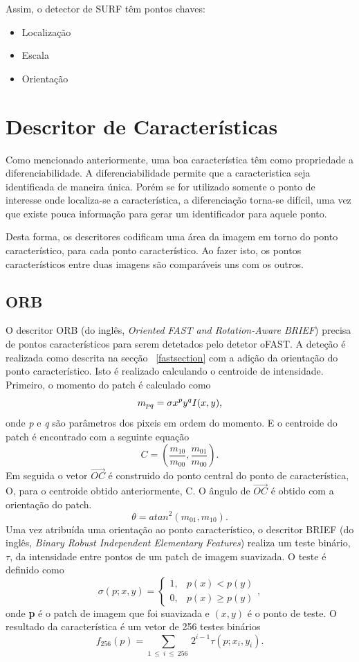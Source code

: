 Assim, o detector de SURF têm pontos chaves:
\begin{itemize}
	\item Localização
	\item Escala
	\item Orientação
\end{itemize}


\section{Descritor de Características}

Como mencionado anteriormente, uma boa característica têm como propriedade a diferenciabilidade. A diferenciabilidade permite que a caracteristica seja identificada de maneira única. Porém se for utilizado somente o ponto de interesse onde localiza-se a característica, a diferenciação torna-se difícil, uma vez que existe pouca informação para gerar um identificador para aquele ponto.

Desta forma, os descritores codificam uma área da imagem em torno do ponto característico, para cada ponto característico. Ao fazer isto, os pontos característicos entre duas imagens são comparáveis uns com os outros.


\subsection{ORB}

O descritor ORB (do inglês, \textit{Oriented FAST and Rotation-Aware BRIEF}) precisa de pontos característicos para serem detetados pelo detetor oFAST. A deteção é realizada como descrita na secção ~\ref{fastsection} com a adição da orientação do ponto característico. Isto é realizado calculando o centroide de intensidade. Primeiro, o momento do patch é calculado como \[ \textit{$m_{pq}$} = \sigma \textit{$ x^py^qI$}(x,y) ,\]
onde \textit{p} e \textit{q} são parâmetros dos pixeis em ordem do momento. E o centroide do patch é encontrado com a seguinte equação \[ C = ( \frac{ \textit{m}_{10} }{ \textit{m}_{00}} ,  \frac{ \textit{m}_{01} }{ \textit{m}_{00}} ) . \]
Em seguida o vetor $\vec{OC}$ é construido do ponto central do ponto de característica, O, para o centroide obtido anteriormente, C. O ângulo de $\vec{OC}$ é obtido com a orientação do patch. \[ \theta = atan^2( \textit{m}_{01},\textit{m}_{10}) . \]
Uma vez atribuída uma orientação ao ponto característico, o descritor BRIEF (do inglês, \textit{Binary Robust Independent Elementary Features}) realiza um teste binário, $\tau$, da intensidade entre pontos de um patch de imagem suavizada. O teste é definido como  \[\sigma\left(p;x,y\right) = \left\{\begin{array}{cc}
1, & p(x)<p(y) \\ 
0, & p(x) \geq  p(y)   
\end{array}\right.
 ,\]
onde \textbf{p} é o patch de imagem que foi suavizada e \textbf{$(x,y)$} é o ponto de teste.
O resultado da característica é um vetor de 256 testes binários \[ f_{256} \left( p \right) = \sum_{1\ \le\ i\ \le\ 256\ } {2^{i-1}\tau\left(p;x_i,y_i\right) } . \]

